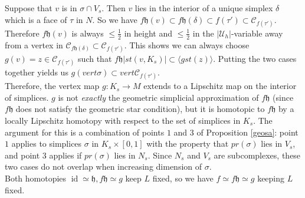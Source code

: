 \documentclass[a4paper,11pt]{article}
\theoremstyle{definition}
\theoremstyle{plain}
\theoremstyle{remark}
\DeclareMathOperator{\id}{id}
\begin{document}
{Suppose that $v$ is in $\sigma \cap V_{s}$. Then $v$ lies in the interior of a unique simplex $\delta$ which is a face of $\tau$ in $N$. So we have $f\mathfrak{h}(v) \subset f\mathfrak{h}(\delta) \subset f(\tau') \subset \mathscr{C}_{f(\tau')}$. Therefore $f\mathfrak{h}(v)$ is always  $\leq \frac{1}{2}$ in height and $\leq \frac{1}{2}$ in the $|\mathcal{U}_{h}|$-variable away from a vertex in $\mathscr{C}_{f\mathfrak{h}(\delta)}\subset \mathscr{C}_{f(\tau')}$. This shows we can always choose $g(v) = z \in \mathscr{C}_{f(\tau')}$ such that $f\mathfrak{h}|st(v,K_{s})|\subset \langle gst(z) \rangle$. Putting the two cases together yields us $g(vert \sigma)\subset vert \mathscr{C}_{f(\tau')}$.\\



Therefore, the vertex map $g: K_s\rightarrow M$ extends to a Lipschitz map on the interior of simplices. $g$ is not \textit{exactly} the geometric simplicial approximation of $f\mathfrak{h}$ (since $f\mathfrak{h}$ does not satisfy the geometric star condition), but it is homotopic to $f\mathfrak{h}$ by a locally Lipschitz homotopy with respect to the set of simplices in $K_{s}$. The argument for this is a combination of points $1$ and $3$ of Proposition \ref{geosa}: point $1$ applies to simplices $\sigma$ in $K_{s} \times [0,1]$ with the property that $pr (\sigma)$  lies in $V_{s}$, and point $3$ applies if $pr(\sigma)$ lies in $N_{s}$. Since $N_{s}$ and $V_{s}$ are subcomplexes, these two cases do not overlap when increasing dimension of $\sigma$. \\

Both homotopies $\id\simeq \mathfrak{h}, f\mathfrak{h}\simeq g$ keep $L$ fixed, so we have $f\simeq f\mathfrak{h} \simeq g$ keeping $L$ fixed. \\



}
\end{document}
